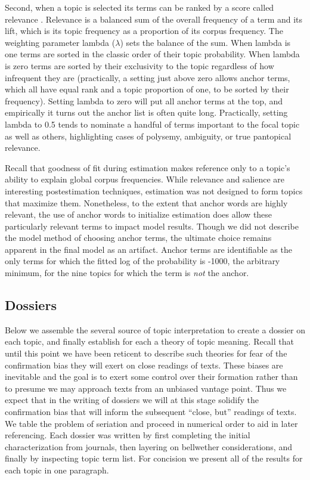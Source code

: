 \documentclass[]{book}
\theoremstyle{definition}
\theoremstyle{definition}
\theoremstyle{definition}
\theoremstyle{remark}
\begin{document}
Second, when a topic is selected its terms can be ranked by a score
called relevance \citep[66]{Sievert2014LDAvis}. Relevance is a balanced
sum of the overall frequency of a term and its lift, which is its topic
frequency as a proportion of its corpus frequency. The weighting
parameter lambda (\(\lambda\)) sets the balance of the sum. When lambda
is one terms are sorted in the classic order of their topic probability.
When lambda is zero terms are sorted by their exclusivity to the topic
regardless of how infrequent they are (practically, a setting just above
zero allows anchor terms, which all have equal rank and a topic
proportion of one, to be sorted by their frequency). Setting lambda to
zero will put all anchor terms at the top, and empirically it turns out
the anchor list is often quite long. Practically, setting lambda to 0.5
tends to nominate a handful of terms important to the focal topic as
well as others, highlighting cases of polysemy, ambiguity, or true
pantopical relevance.

Recall that goodness of fit during estimation makes reference only to a
topic's ability to explain global corpus frequencies. While relevance
and salience are interesting postestimation techniques, estimation was
not designed to form topics that maximize them. Nonetheless, to the
extent that anchor words are highly relevant, the use of anchor words to
initialize estimation does allow these particularly relevant terms to
impact model results. Though we did not describe the model method of
choosing anchor terms, the ultimate choice remains apparent in the final
model as an artifact. Anchor terms are identifiable as the only terms
for which the fitted log of the probability is -1000, the arbitrary
minimum, for the nine topics for which the term is \emph{not} the
anchor.

\hypertarget{dossiers}{%
\subsection{Dossiers}\label{dossiers}}

Below we assemble the several source of topic interpretation to create a
dossier on each topic, and finally establish for each a theory of topic
meaning. Recall that until this point we have been reticent to describe
such theories for fear of the confirmation bias they will exert on close
readings of texts. These biases are inevitable and the goal is to exert
some control over their formation rather than to presume we may approach
texts from an unbiased vantage point. Thus we expect that in the writing
of dossiers we will at this stage solidify the confirmation bias that
will inform the subsequent ``close, but'' readings of texts. We table
the problem of seriation and proceed in numerical order to aid in later
referencing. Each dossier was written by first completing the initial
characterization from journals, then layering on bellwether
considerations, and finally by inspecting topic term list. For concision
we present all of the results for each topic in one paragraph.
\end{document}

